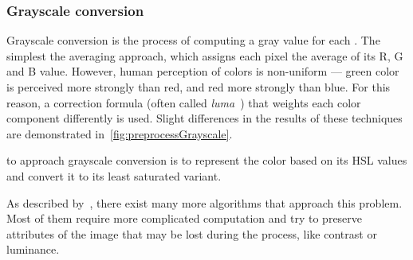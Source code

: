
\subsubsection{Grayscale conversion} \label{grayscaleConversion}

Grayscale conversion is the process of computing a gray value for each .  The simplest  the averaging approach, which assigns each pixel the average of its R, G and B value. However, human perception of colors is non-uniform --- green color is perceived more strongly than red, and red more strongly than blue. For this reason, a correction formula (often called \emph{luma}~\cite{grayscaleConv}) that weights each color component differently is used. Slight differences in the results of these techniques are demonstrated in~\cref{fig:preprocessGrayscale}.

 to approach grayscale conversion is to represent the color based on its HSL values and convert it to its least saturated variant.

As described by~\citet{grayscaleCadik}, there exist many more algorithms that approach this problem. Most of them require more complicated computation and try to preserve attributes of the image that may be lost during the process, like contrast or luminance.

